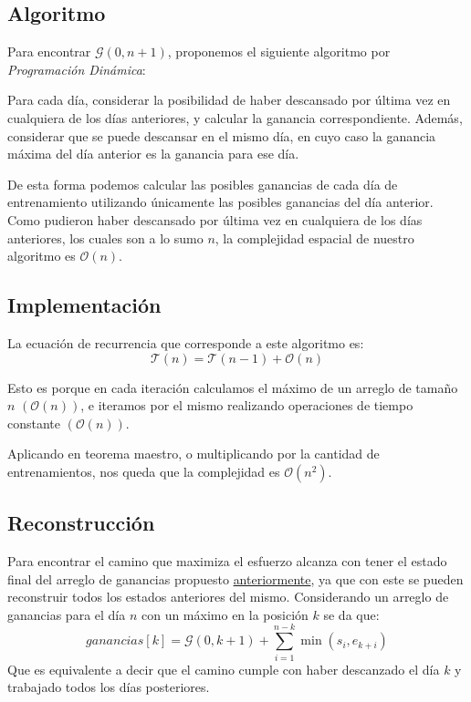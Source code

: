 \subsection{Algoritmo}

Para encontrar $\mathcal{G} \left( 0, n + 1 \right)$, proponemos el siguiente
algoritmo por \textit{Programaci\'on Din\'amica}:

Para cada d\'ia, considerar la posibilidad de haber descansado por \'ultima
vez en cualquiera de los d\'ias anteriores, y calcular la ganancia
correspondiente. Adem\'as, considerar que se puede descansar en el mismo d\'ia,
en cuyo caso la ganancia m\'axima del d\'ia anterior es la ganancia para ese
d\'ia.

De esta forma podemos calcular las posibles ganancias de cada d\'ia de
entrenamiento utilizando \'unicamente las posibles ganancias del d\'ia
anterior. Como pudieron haber descansado por \'ultima vez en cualquiera de los
d\'ias anteriores, los cuales son a lo sumo $n$, la complejidad espacial de
nuestro algoritmo es $\mathcal{O}(n)$.

\subsection{Implementaci\'on}
\label{sec:implementacion}



La ecuaci\'on de recurrencia que corresponde a este algoritmo es:
\begin{equation*}
    \mathcal{T}(n) = \mathcal{T}\left(n - 1\right) + \mathcal{O}\left(n\right)
\end{equation*}

Esto es porque en cada iteraci\'on calculamos el m\'aximo de un arreglo de
tama\~no $n$ $\left( \mathcal{O}(n) \right)$, e iteramos por el mismo
realizando operaciones de tiempo constante $\left( \mathcal{O}(n) \right)$.

Aplicando en teorema maestro, o multiplicando por la cantidad de
entrenamientos, nos queda que la complejidad es $\mathcal{O}(n^2)$.
 
\subsection{Reconstrucci\'on}

Para encontrar el camino que maximiza el esfuerzo alcanza con tener el estado final
del arreglo de ganancias propuesto \hyperref[sec:implementacion]{anteriormente},
ya que con este se pueden reconstruir todos los estados anteriores del mismo.
Considerando un arreglo de ganancias para el día $n$ con un máximo en la
posici\'on $k$ se da que:
\begin{equation*}
    ganancias[k] = \mathcal{G} ( 0, k + 1 ) + \sum_{i=1}^{n-k} \min (s_i, e_{k+i})
\end{equation*}
    Que es equivalente a decir que el camino cumple con haber descanzado el día
$k$ y trabajado todos los días posteriores.\\

